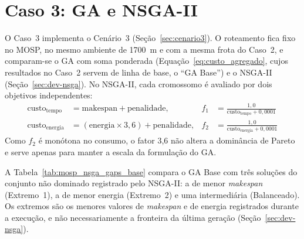 \section{Caso 3: GA e NSGA-II}\label{sec:caso3}

O Caso~3 implementa o Cenário~3 (Seção~\ref{sec:cenario3}). O roteamento fica fixo no MOSP, no mesmo ambiente de 1700~m e com a mesma frota do Caso~2, e comparam-se o GA com soma ponderada (Equação~\ref{eq:custo_agregado}, cujos resultados no Caso~2 servem de linha de base, o ``GA Base'') e o NSGA-II (Seção~\ref{sec:dev-nsga}). No NSGA-II, cada cromossomo é avaliado por dois objetivos independentes:
\begin{align}
\text{custo}_{\text{tempo}} &= \text{makespan} + \text{penalidade}, & f_1 &= \frac{1{,}0}{\text{custo}_{\text{tempo}} + 0{,}0001} \\
\text{custo}_{\text{energia}} &= (\text{energia} \times 3{,}6) + \text{penalidade}, & f_2 &= \frac{1{,}0}{\text{custo}_{\text{energia}} + 0{,}0001}
\end{align}
Como $f_2$ é monótona no consumo, o fator 3,6 não altera a dominância de Pareto e serve apenas para manter a escala da formulação do GA.

A Tabela~\ref{tab:mosp_nsga_gaps_base} compara o GA Base com três soluções do conjunto não dominado registrado pelo NSGA-II: a de menor \textit{makespan} (Extremo~1), a de menor energia (Extremo~2) e uma intermediária (Balanceado). Os extremos são os menores valores de \textit{makespan} e de energia registrados durante a execução, e não necessariamente a fronteira da última geração (Seção~\ref{sec:dev-nsga}).

